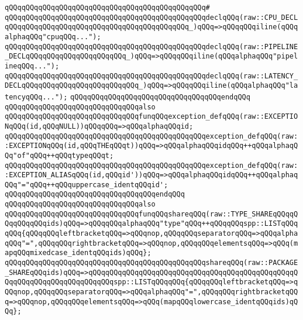 \verb|qQQqqQQqqQQqqQQqqQQqqQQqqQQqqQQqqQQqqQQqqQQqqQQq#|\newline
\verb|qQQqqQQqqQQqqQQqqQQqqQQqqQQqqQQqqQQqqQQqqQQqqQQqdeclqQQq(raw::CPU_DECLqQQqqQQqqQQqqQQqqQQqqQQqqQQqqQQqqQQqqQQqqQQq_)qQQq=>qQQqqQQqiline(qQQqalphaqQQq"cpuqQQq...");|\newline
\verb|qQQqqQQqqQQqqQQqqQQqqQQqqQQqqQQqqQQqqQQqqQQqqQQqdeclqQQq(raw::PIPELINE_DECLqQQqqQQqqQQqqQQqqQQqqQQq_)qQQq=>qQQqqQQqiline(qQQqalphaqQQq"pipelineqQQq...");|\newline
\verb|qQQqqQQqqQQqqQQqqQQqqQQqqQQqqQQqqQQqqQQqqQQqqQQqdeclqQQq(raw::LATENCY_DECLqQQqqQQqqQQqqQQqqQQqqQQqqQQq_)qQQq=>qQQqqQQqiline(qQQqalphaqQQq"latencyqQQq...");|\newline
\verb|qQQqqQQqqQQqqQQqqQQqqQQqqQQqqQQqqQQqendqQQq|\newline
\newline
\verb|qQQqqQQqqQQqqQQqqQQqqQQqqQQqqQQqalso|\newline
\verb|qQQqqQQqqQQqqQQqqQQqqQQqqQQqqQQqfunqQQqexception_defqQQq(raw::EXCEPTIONqQQq(id,qQQqNULL))qQQqqQQq=>qQQqalphaqQQqid;|\newline
\verb|qQQqqQQqqQQqqQQqqQQqqQQqqQQqqQQqqQQqqQQqqQQqqQQqexception_defqQQq(raw::EXCEPTIONqQQq(id,qQQqTHEqQQqt))qQQq=>qQQqalphaqQQqidqQQq++qQQqalphaqQQq"of"qQQq++qQQqtypeqQQqt;|\newline
\verb|qQQqqQQqqQQqqQQqqQQqqQQqqQQqqQQqqQQqqQQqqQQqqQQqexception_defqQQq(raw::EXCEPTION_ALIASqQQq(id,qQQqid'))qQQq=>qQQqalphaqQQqidqQQq++qQQqalphaqQQq"="qQQq++qQQquppercase_identqQQqid';|\newline
\verb|qQQqqQQqqQQqqQQqqQQqqQQqqQQqqQQqqQQqendqQQq|\newline
\newline
\verb|qQQqqQQqqQQqqQQqqQQqqQQqqQQqqQQqalso|\newline
\verb|qQQqqQQqqQQqqQQqqQQqqQQqqQQqqQQqfunqQQqshareqQQq(raw::TYPE_SHAREqQQqqQQqqQQqqQQqids)qQQq=>qQQqqQQqalphaqQQq"type"qQQq++qQQqqQQqspp::LISTqQQqqQQq{qQQqqQQqleftbracketqQQq=>qQQqnop,qQQqqQQqseparatorqQQq=>qQQqalphaqQQq"=",qQQqqQQqrightbracketqQQq=>qQQqnop,qQQqqQQqelementsqQQq=>qQQq(mapqQQqmixedcase_identqQQqids)qQQq};|\newline
\verb|qQQqqQQqqQQqqQQqqQQqqQQqqQQqqQQqqQQqqQQqqQQqqQQqshareqQQq(raw::PACKAGE_SHAREqQQqids)qQQq=>qQQqqQQqqQQqqQQqqQQqqQQqqQQqqQQqqQQqqQQqqQQqqQQqqQQqqQQqqQQqqQQqqQQqqQQqqQQqspp::LISTqQQqqQQq{qQQqqQQqleftbracketqQQq=>qQQqnop,qQQqqQQqseparatorqQQq=>qQQqalphaqQQq"=",qQQqqQQqrightbracketqQQq=>qQQqnop,qQQqqQQqelementsqQQq=>qQQq(mapqQQqlowercase_identqQQqids)qQQq};|\newline
